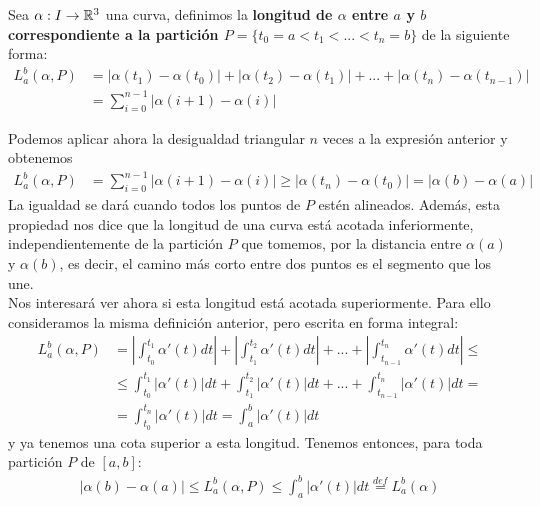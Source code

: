 \begin{definicion}
    Sea $\alpha: I \to \mathbb{R}^3$ una curva, definimos la \textbf{longitud de $\alpha$ entre $a$ y $b$ correspondiente a la partición $P=\{t_0=a<t_1<...<t_n=b\}$} de la siguiente forma:
    \begin{align*}
        L_a^b(\alpha, P) &= |\alpha(t_1) - \alpha(t_0)| + |\alpha(t_2) - \alpha(t_1)| + ... + |\alpha(t_n) - \alpha(t_{n-1})| \\
        &= \sum_{i=0}^{n-1} |\alpha(i+1) - \alpha(i)|
    \end{align*}
\end{definicion}

\begin{observacion}
    Podemos aplicar ahora la desigualdad triangular $n$ veces a la expresión anterior y obtenemos
    \begin{align*}
        L_a^b(\alpha, P)  &= \sum_{i=0}^{n-1} |\alpha(i+1) - \alpha(i)| \geq |\alpha(t_n) - \alpha(t_0)| = |\alpha(b)-\alpha(a)|
    \end{align*}
    La igualdad se dará cuando todos los puntos de $P$ estén alineados. Además, esta propiedad nos dice que la longitud de una curva está acotada inferiormente, independientemente de la partición $P$ que tomemos, por la distancia entre $\alpha(a)$ y $\alpha(b)$, es decir, el camino más corto entre dos puntos es el segmento que los une.\\
    
    Nos interesará ver ahora si esta longitud está acotada superiormente. Para ello consideramos la misma definición anterior, pero escrita en forma integral:
    \begin{align*}
        L_a^b(\alpha, P) &= \left|\int_{t_0}^{t_1} \alpha'(t) dt\right| + \left|\int_{t_1}^{t_2} \alpha'(t) dt\right| + ... + \left|\int_{t_{n-1}}^{t_n} \alpha'(t) dt\right| \leq \\
        &\leq \int_{t_0}^{t_1} |\alpha'(t)| dt + \int_{t_1}^{t_2} |\alpha'(t)| dt + ... + \int_{t_{n-1}}^{t_n} |\alpha'(t)| dt =\\
        &= \int_{t_0}^{t_n} |\alpha'(t)| dt = \int_{a}^{b} |\alpha'(t)| dt
    \end{align*}
    y ya tenemos una cota superior a esta longitud. Tenemos entonces, para toda partición $P$ de $[a,b]$:
    \begin{gather*}
        |\alpha(b)-\alpha(a)| \leq L_a^b(\alpha, P) \leq \int_{a}^{b} |\alpha'(t)| dt \overset{def}{=} L_a^b(\alpha)
    \end{gather*}


\end{observacion}
